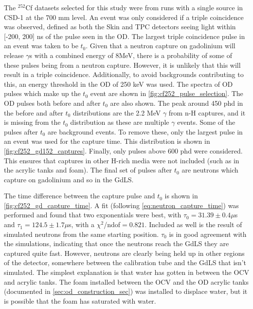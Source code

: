 \par
The ${}^{252}$Cf datasets selected for this study were from runs with a single source in CSD-1 at the 700 mm level.
An event was only considered if a triple coincidence was observed, defined as both the Skin and TPC detectors seeing light within [-200, 200] ns of the pulse seen in the OD.
The largest triple coincidence pulse in an event was taken to be $t_0$.
Given that a neutron capture on gadolinium will release $\gamma$s with a combined energy of 8MeV, there is a probability of some of these pulses being from a neutron capture.
However, it is unlikely that this will result in a triple coincidence.
Additionally, to avoid backgrounds contributing to this, an energy threshold in the OD of 250 keV was used.
The spectra of OD pulses which make up the $t_0$ event are shown in \autoref{fig:cf252_pulse_selection}.
The OD pulses both before and after $t_0$ are also shown.
The peak around 450 phd in the before and after $t_0$ distributions are the 2.2 MeV $\gamma$ from n-H captures, and it is missing from the $t_0$ distribution as these are multiple $\gamma$ events.
Some of the pulses after $t_0$ are background events.
To remove these, only the largest pulse in an event was used for the capture time.
This distribution is shown in \autoref{fig:cf252_gd152_captures}.
Finally, only pulses above 600 phd were considered.
This ensures that captures in other H-rich media were not included (such as in the acrylic tanks and foam).
The final set of pulses after $t_0$ are neutrons which capture on gadolinium and so in the GdLS.





\par
The time difference between the capture pulse and $t_0$ is shown in \autoref{fig:cf252_gd_capture_time}.
A fit (following \autoref{eq:neutron_capture_time}) was performed and found that two exponentials were best, with $\tau_0 = 31.39 \pm 0.4\mu$s and $\tau_1 = 124.5 \pm 1.7\mu$s, with a $\chi^2$/ndof$=0.821$.
Included as well is the result of simulated neutrons from the same starting position.
$\tau_0$ is in good agreement with the simulations, indicating that once the neutrons reach the GdLS they are captured quite fast.
However, neutrons are clearly being held up in other regions of the detector, somewhere between the calibration tube and the GdLS that isn't simulated.
The simplest explanation is that water has gotten in between the OCV and acrylic tanks.
The foam installed between the OCV and the OD acrylic tanks (documented in \autoref{sec:od_construction_sec}) was installed to displace water, but it is possible that the foam has saturated with water.

